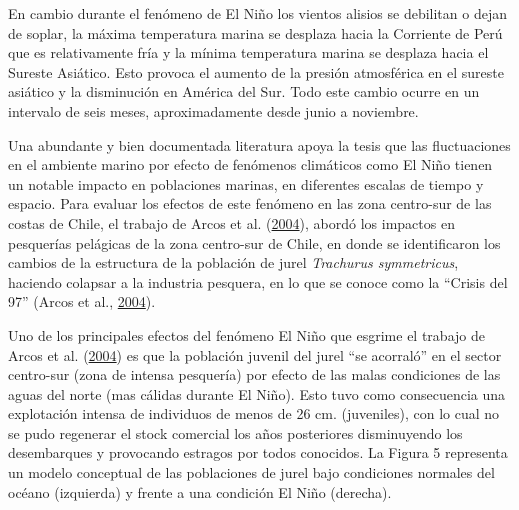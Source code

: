 \documentclass[
]{article}
\begin{document}
En cambio durante el fenómeno de El Niño los vientos alisios se
debilitan o dejan de soplar, la máxima temperatura marina se desplaza
hacia la Corriente de Perú que es relativamente fría y la mínima
temperatura marina se desplaza hacia el Sureste Asiático. Esto provoca
el aumento de la presión atmosférica en el sureste asiático y la
disminución en América del Sur. Todo este cambio ocurre en un intervalo
de seis meses, aproximadamente desde junio a noviembre.

Una abundante y bien documentada literatura apoya la tesis que las
fluctuaciones en el ambiente marino por efecto de fenómenos climáticos
como El Niño tienen un notable impacto en poblaciones marinas, en
diferentes escalas de tiempo y espacio. Para evaluar los efectos de este
fenómeno en las zona centro-sur de las costas de Chile, el trabajo de
Arcos et al. (\protect\hyperlink{ref-Arcos2004}{2004}), abordó los
impactos en pesquerías pelágicas de la zona centro-sur de Chile, en
donde se identificaron los cambios de la estructura de la población de
jurel \emph{Trachurus symmetricus}, haciendo colapsar a la industria
pesquera, en lo que se conoce como la ``Crisis del 97'' (Arcos et al.,
\protect\hyperlink{ref-Arcos2004}{2004}).

Uno de los principales efectos del fenómeno El Niño que esgrime el
trabajo de Arcos et al. (\protect\hyperlink{ref-Arcos2004}{2004}) es que
la población juvenil del jurel ``se acorraló'' en el sector centro-sur
(zona de intensa pesquería) por efecto de las malas condiciones de las
aguas del norte (mas cálidas durante El Niño). Esto tuvo como
consecuencia una explotación intensa de individuos de menos de 26 cm.
(juveniles), con lo cual no se pudo regenerar el stock comercial los
años posteriores disminuyendo los desembarques y provocando estragos por
todos conocidos. La Figura 5 representa un modelo conceptual de las
poblaciones de jurel bajo condiciones normales del océano (izquierda) y
frente a una condición El Niño (derecha).
\end{document}
